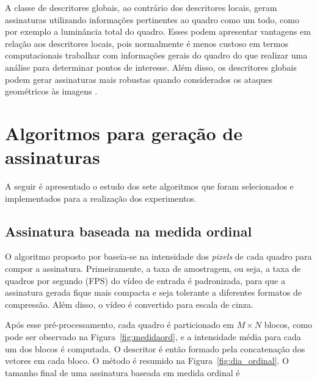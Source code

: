     A classe de descritores globais, ao contrário dos descritores locais, geram assinaturas utilizando informações pertinentes ao quadro como um todo, como por exemplo a luminância total do quadro. Esses podem apresentar vantagens em relação aos descritores locais, pois normalmente é menos custoso em termos computacionais trabalhar com informações gerais do quadro do que realizar uma análise para determinar pontos de interesse. Além disso, os descritores globais podem gerar assinaturas mais robustas quando considerados os ataques geométricos às imagens \cite{law2007video}. 
    
\section{Algoritmos para geração de assinaturas}

	
	A seguir é apresentado o estudo dos sete algoritmos que foram selecionados e implementados para a realização dos experimentos.


%
%
\subsection{Assinatura baseada na medida ordinal}
\label{sec:med_ordinal}

	O algoritmo proposto por  baseia-se na intensidade dos \textit{pixels} de cada quadro para compor a assinatura. Primeiramente, a taxa de amostragem, ou seja, a taxa de quadros por segundo (FPS) do vídeo de entrada é padronizada, para que a assinatura gerada fique mais compacta e seja tolerante a diferentes formatos de compressão. Além disso, o vídeo é convertido para escala de cinza.

	Após esse pré-processamento, cada quadro é particionado em $M \times N$ blocos, como pode ser observado na Figura~\ref{fig:medidaord}, e a intensidade média para cada um dos blocos é computada. O descritor é então formado pela concatenação dos vetores em cada bloco. O método é resumido na Figura~\ref{fig:dia_ordinal}. O tamanho final de uma assinatura baseada em medida ordinal é

